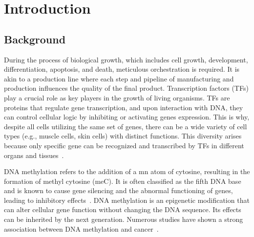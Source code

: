 \documentclass{PHlab-thesis}
\begin{document}


\renewcommand\nomgroup[1]{%
  \item[\bfseries
  \ifstrequal{#1}{A}{General}{%
  \ifstrequal{#1}{Z}{Gene/Protein Names}%
  }]}





\printnomenclature[5cm]

\newpage
\setcounter{page}{1}


\chapter{Introduction}
\section{Background}
During the process of biological growth, which includes cell growth, development, differentiation, apoptosis, and death, meticulous orchestration is required. It is akin to a production line where each step and pipeline of manufacturing and production influences the quality of the final product. Transcription factors (TFs) play a crucial role as key players in the growth of living organisms. TFs are proteins that regulate gene transcription, and upon interaction with DNA, they can control cellular logic by inhibiting or activating genes expression. This is why, despite all cells utilizing the same set of genes, there can be a wide variety of cell types (e.g., muscle cells, skin cells) with distinct functions. This diversity arises because only specific gene can be recognized and transcribed by TFs in different organs and tissues~\cite{lambert2018human}.

DNA methylation refers to the addition of a mn atom of cytosine, resulting in the formation of methyl cytosine (meC). It is often classified as the fifth DNA base~\cite{Listerfifthbase2009, Vinermethylsensitive2016} and is known to cause gene silencing and the abnormal functioning of genes, leading to inhibitory effects~\cite{Jones2012DNAmethylationislands}. DNA methylation is an epigenetic modification that can alter cellular gene function without changing the DNA sequence. Its effects can be inherited by the next generation. Numerous studies have shown a strong association between DNA methylation and cancer~\cite{KeithDNAmethyl2005, Feinberg1983Hypomethylation}.
\end{document}
